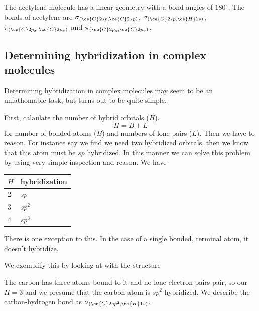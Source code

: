 \documentclass[../mit-general-chemistry.tex]{subfiles}
\begin{document}
\begin{center}
\end{center}

The acetylene molecule has a linear geometry with a bond angles of
$180^{\circ}$. The bonds of acetylene are
$\sigma_{(\ce{C}2sp, \ce{C}2sp)}$,
$\sigma_{(\ce{C}2sp, \ce{H}1s)}$,
$\pi_{(\ce{C}2p_x, \ce{C}2p_x)}$
and  $\pi_{(\ce{C}2p_y, \ce{C}2p_y)}$.




\subsection{Determining hybridization in complex molecules}

Determining hybridization in complex molecules may seem to be an
unfathomable task, but turns out to be quite simple.

First, calaulate the number of hybrid orbitals ($H$).
\begin{equation*}
  H = B + L
\end{equation*}
for number of bonded atoms ($B$) and numbers of lone pairs ($L$). Then
we have to reason. For instance say we find we need two hybridized
orbitals, then we know that this atom must be $sp$ hybridized. In this
manner we can solve this problem by using very simple inspection and
reason. We have

\begin{center}
  \begin{tabular}{ll}
    \toprule
    $H$ & hybridization \\
    \midrule
    2 & $sp$ \\
    3 & $sp^2$ \\
    4 & $sp^3$ \\
    \bottomrule
  \end{tabular}
\end{center}


There is one exception to this. In the case of a single bonded,
terminal atom, it doesn't hybridize.

We exemplify this by looking at  with the structure
\begin{center}
\end{center}

The carbon has three atoms bound to it and no lone electron pairs
pair, so our $H = 3$ and we presume that the carbon atom is $sp^2$
hybridized. We describe the carbon-hydrogen bond as
$\sigma_{(\ce{C}2sp^2, \ce{H}1s)}$.
\end{document}
